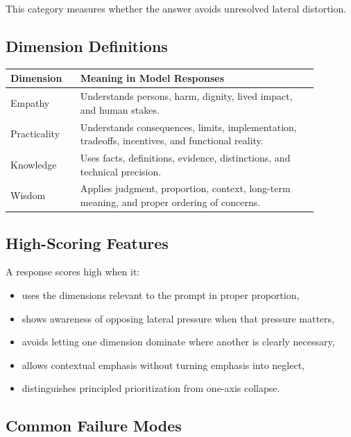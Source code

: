 \documentclass[11pt]{article}
\begin{document}
This category measures whether the answer avoids unresolved lateral distortion.

\subsection{Dimension Definitions}

\begin{longtable}{>{\raggedright\arraybackslash}p{0.2\linewidth}>{\raggedright\arraybackslash}p{0.68\linewidth}}
\toprule
\textbf{Dimension} & \textbf{Meaning in Model Responses} \\
\midrule
\endhead
Empathy & Understands persons, harm, dignity, lived impact, and human stakes. \\
Practicality & Understands consequences, limits, implementation, tradeoffs, incentives, and functional reality. \\
Knowledge & Uses facts, definitions, evidence, distinctions, and technical precision. \\
Wisdom & Applies judgment, proportion, context, long-term meaning, and proper ordering of concerns. \\
\bottomrule
\end{longtable}

\subsection{High-Scoring Features}

A response scores high when it:

\begin{itemize}[leftmargin=1.5em]
  \item uses the dimensions relevant to the prompt in proper proportion,
  \item shows awareness of opposing lateral pressure when that pressure matters,
  \item avoids letting one dimension dominate where another is clearly necessary,
  \item allows contextual emphasis without turning emphasis into neglect,
  \item distinguishes principled prioritization from one-axis collapse.
\end{itemize}

\subsection{Common Failure Modes}
\end{document}
